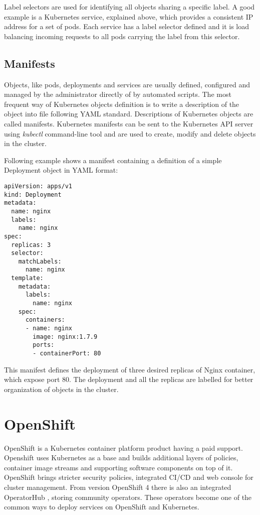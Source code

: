 \documentclass[
  digital, %
  twoside, %
  table,   %
  lof,     %
  lot,     %
]{fithesis3}
\begin{document}
Label selectors are used for identifying all objects sharing a specific label. A good example is a Kubernetes service, explained above, which provides a consistent IP address for a set of pods. Each service has a label selector defined and it is load balancing incoming requests to all pods carrying the label from this selector.

\subsection{Manifests} \label{sec:manifest}
Objects, like pods, deployments and services are usually defined, configured and managed by the administrator directly of by automated scripts. The most frequent way of Kubernetes objects definition is to write a description of the object into file following YAML \cite{YAML} standard. Descriptions of Kubernetes objects are called manifests. Kubernetes manifests can be sent to the Kubernetes API server \cite{kubernetes-api} using \textit{kubectl} \cite{kubectl} command-line tool and are used to create, modify and delete objects in the cluster.

Following example shows a manifest containing a definition of a simple Deployment object in YAML format:
\begin{lstlisting}
apiVersion: apps/v1
kind: Deployment
metadata:
  name: nginx
  labels:
    name: nginx
spec:
  replicas: 3
  selector:
    matchLabels:
      name: nginx
  template:
    metadata:
      labels:
        name: nginx
    spec:
      containers:
      - name: nginx
        image: nginx:1.7.9
        ports:
        - containerPort: 80
\end{lstlisting}

This manifest defines the deployment of three desired replicas of Nginx \cite{nginx} container, which expose port 80. The deployment and all the replicas are labelled for better organization of objects in the cluster.

\section{OpenShift} \label{sec:openshift}
OpenShift \cite{rhccos} is a Kubernetes container platform product having a paid support. Openshift uses Kubernetes as a base and builds additional layers of policies, container image streams and supporting software components on top of it. OpenShift brings stricter security policies, integrated CI/CD and web console for cluster management. From version OpenShift 4 there is also an integrated OperatorHub \cite{operatorhub}, storing community operators. These operators become one of the common ways to deploy services on OpenShift and Kubernetes.
\end{document}
